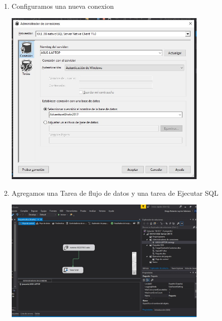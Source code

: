 \begin{enumerate}
    \item Configuramos una nueva conexion 
     \begin{center}
            \includegraphics[width=10cm]{imagenes/registros_2_conexion.jpg}
        \end{center}
        
   \item Agregamos una Tarea de flujo de datos y  una tarea de Ejecutar SQL
     \begin{center}
            \includegraphics[width=10cm]{imagenes/registros_componentes.jpg}
        \end{center}
        
        
                

\end{enumerate}
